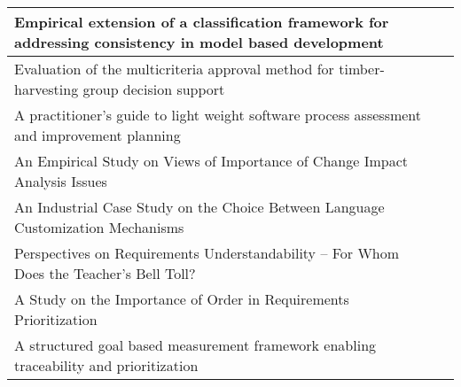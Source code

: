 \begin{table}[h!]
{\begin{tabular}{
|>{\raggedright}p{}
|>{\raggedright}p{}
|}
Empirical extension of a classification framework for addressing consistency in model based development & \citet{Kuzniarz2010}\tabularnewline \hline
Evaluation of the multicriteria approval method for timber-harvesting group decision support & \citet{Laukkanen2005a} \tabularnewline \hline
A practitioner's guide to light weight software process assessment and improvement planning & \citet{Pettersson2008} \tabularnewline \hline
An Empirical Study on Views of Importance of Change Impact Analysis Issues & \citet{Rovegard2008} \tabularnewline \hline
An Industrial Case Study on the Choice Between Language Customization Mechanisms & \citet{Staron2006} \tabularnewline \hline
Perspectives on Requirements Understandability -- For Whom Does the Teacher's Bell Toll? & \citet{Svahnberg2008} \tabularnewline \hline
A Study on the Importance of Order in Requirements Prioritization & \citet{Svahnberg2009} \tabularnewline \hline
A structured goal based measurement framework enabling traceability and prioritization & \citet{Touseef2010} \tabularnewline \hline

\end{tabular}
} %
\end{table}

